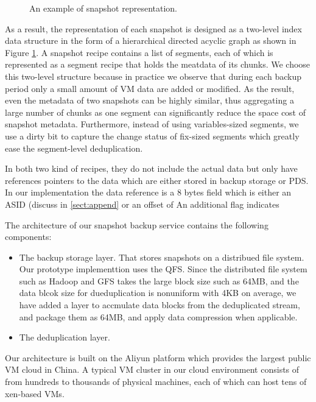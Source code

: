 \begin{figure}[htbp]
  \centering
  \caption{An example of snapshot representation.}
  \label{fig:snapshot}
\end{figure}
As a result, the representation of each snapshot is designed as a two-level index data structure 
in the form of a hierarchical directed acyclic graph as shown in Figure \ref{fig:snapshot}.
A snapshot recipe contains a list of segments, each of which is represented as a segment recipe
that holds the meatdata of its chunks. We choose this two-level structure because in practice we
observe that during each backup period only a small amount of VM data are added or modified. 
As the result, even the metadata of two snapshots can be highly similar, 
thus aggregating a large number of chunks as one segment can significantly reduce the space cost of snapshot metadata.
Furthermore, instead of using variables-sized segments, we use a dirty bit to capture the change status of fix-sized
segments which greatly ease the segment-level deduplication.

In both two kind of recipes, 
they do not include the actual data but only have
 references pointers to the data which are either stored in backup storage or PDS.
In our implementation the data reference is a 8 bytes field which is either an 
ASID (discuss in \ref{sect:append} or an offset of 
An additional flag indicates


The architecture of our snapshot backup service contains the following components:
\begin{itemize}

\item  The backup storage layer. 
That stores snapshots on a distribued file system. 
Our prototype implementtion uses the QFS.
Since the distributed file system such as Hadoop and GFS takes the large block size such as 64MB,
and the data blcok size for dueduplication is nonuniform with 4KB on average,
we have added a layer to accmulate  data blocks from the deduplicated stream, and 
package them as 64MB, and apply data compression when applicable.

\item The deduplication layer.

\end{itemize}

Our architecture is built on the Aliyun platform which provides the largest public VM cloud in China. 
A typical VM cluster in our cloud environment
consists of from hundreds to thousands of physical machines, each of which can
host tens of xen-based\cite{Barham2003} VMs.

